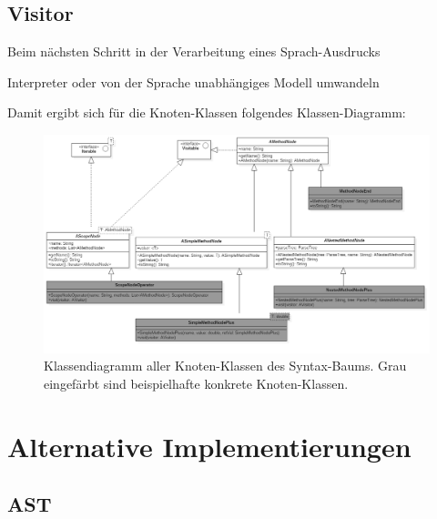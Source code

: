 \subsection{Visitor}\label{ssct:4.3.5:visitor}
Beim nächsten Schritt in der Verarbeitung eines Sprach-Ausdrucks

Interpreter oder von der Sprache unabhängiges Modell umwandeln

Damit ergibt sich für die Knoten-Klassen folgendes Klassen-Diagramm:

\begin{figure}[H]
\centering\includegraphics[width=.9\textwidth]{images/kapitel4/classDiagram1.png}
\caption{Klassendiagramm aller Knoten-Klassen des Syntax-Baums. Grau eingefärbt sind beispielhafte konkrete Knoten-Klassen.}
\label{fig:class-diagram1}
\end{figure}

\section{Alternative Implementierungen}

\subsection{AST}\label{sct:4.3.4:ast}
